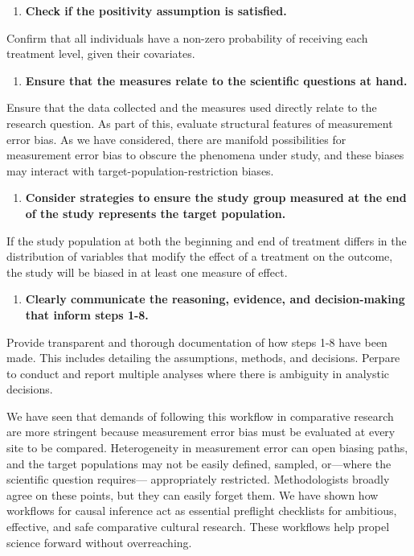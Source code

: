 \documentclass[
  single column]{article}
\providecommand{\tightlist}{%
  \setlength{\itemsep}{0pt}\setlength{\parskip}{0pt}}\usepackage{longtable,booktabs,array}
\begin{document}
\begin{enumerate}
\def\labelenumi{\arabic{enumi}.}
\setcounter{enumi}{5}
\tightlist
\item
  \textbf{Check if the positivity assumption is satisfied.}
\end{enumerate}

Confirm that all individuals have a non-zero probability of receiving
each treatment level, given their covariates.

\begin{enumerate}
\def\labelenumi{\arabic{enumi}.}
\setcounter{enumi}{6}
\tightlist
\item
  \textbf{Ensure that the measures relate to the scientific questions at
  hand.}
\end{enumerate}

Ensure that the data collected and the measures used directly relate to
the research question. As part of this, evaluate structural features of
measurement error bias. As we have considered, there are manifold
possibilities for measurement error bias to obscure the phenomena under
study, and these biases may interact with target-population-restriction
biases.

\begin{enumerate}
\def\labelenumi{\arabic{enumi}.}
\setcounter{enumi}{7}
\tightlist
\item
  \textbf{Consider strategies to ensure the study group measured at the
  end of the study represents the target population.}
\end{enumerate}

If the study population at both the beginning and end of treatment
differs in the distribution of variables that modify the effect of a
treatment on the outcome, the study will be biased in at least one
measure of effect.

\begin{enumerate}
\def\labelenumi{\arabic{enumi}.}
\setcounter{enumi}{8}
\tightlist
\item
  \textbf{Clearly communicate the reasoning, evidence, and
  decision-making that inform steps 1-8.}
\end{enumerate}

Provide transparent and thorough documentation of how steps 1-8 have
been made. This includes detailing the assumptions, methods, and
decisions. Perpare to conduct and report multiple analyses where there
is ambiguity in analystic decisions.

We have seen that demands of following this workflow in comparative
research are more stringent because measurement error bias must be
evaluated at every site to be compared. Heterogeneity in measurement
error can open biasing paths, and the target populations may not be
easily defined, sampled, or---where the scientific question requires---
appropriately restricted. Methodologists broadly agree on these points,
but they can easily forget them. We have shown how workflows for causal
inference act as essential preflight checklists for ambitious,
effective, and safe comparative cultural research. These workflows help
propel science forward without overreaching.
\end{document}
